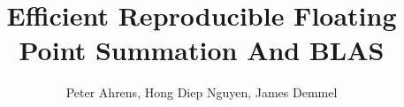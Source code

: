 \documentclass[12pt]{article}
\author{Peter Ahrens, Hong Diep Nguyen, James Demmel}
\title{Efficient Reproducible Floating Point Summation And BLAS}
\theoremstyle{definition}
\numberwithin{equation}{section}
\numberwithin{figure}{section}
\begin{document}
\noindent
\maketitle
\tableofcontents
\newpage













\end{document}
